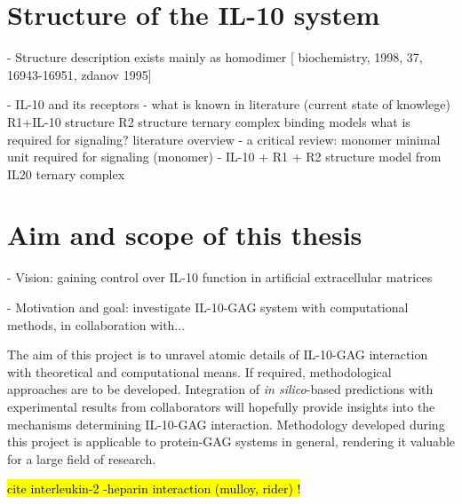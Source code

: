 \lipsum[1-5]

\section{Structure of the IL-10 system}

    - Structure description
        exists mainly as homodimer [
            biochemistry, 1998, 37, 16943-16951, zdanov 1995]


    - IL-10 and its receptors
        - what is known in literature (current state of knowlege)
            R1+IL-10 structure
            R2 structure
            ternary complex binding models
            what is required for signaling? literature overview
        - a critical review: monomer
            minimal unit required for signaling (monomer)
        - IL-10 + R1 + R2 structure model from IL20 ternary complex


\section{Aim and scope of this thesis}

- Vision: gaining control over IL-10 function in artificial extracellular matrices

- Motivation and goal: investigate IL-10-GAG system with computational
      methods, in collaboration with...

The aim of this project is to unravel atomic details of IL-10-GAG interaction
with theoretical and computational means. If required, methodological approaches
are to be developed. Integration of \textit{in silico}-based predictions with
experimental results from collaborators will hopefully provide insights into the
mechanisms determining IL-10-GAG interaction. Methodology developed during this
project is applicable to protein-GAG systems in general, rendering it valuable
for a large field of research.



\hl{cite interleukin-2 -heparin interaction (mulloy, rider) !}

\lipsum[1-5]





